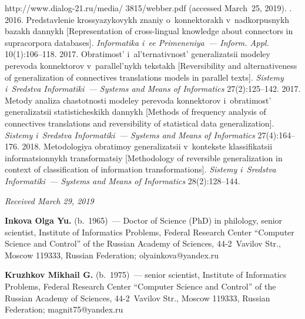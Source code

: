 \begin{multicols}{2}
{{\begin{thebibliography}{99}
{\sf http://www.dialog-21.ru/media/ 3815/webber.pdf} (accessed 
March~25, 2019).
. 2016. 
Predstavlenie krossyazykovykh znaniy o~konnektorakh v~nadkorpusnykh bazakh dannykh 
[Representation of cross-lingual knowledge about connectors in supracorpora databases]. 
\textit{Informatika i~ee Primeneniya~--- Inform. Appl.} 10(1):106--118.
 2017. Obratimost' 
i~al'ternativnost' generalizatsii modeley perevoda konnektorov v~parallel'nykh tekstakh 
[Reversibility and alternativeness of generalization of connectives translations models in 
parallel texts]. \textit{Sistemy i~Sredstva Informatiki~--- Systems and Means of Informatics} 
27(2):125--142.
 2017. Metody analiza 
chastotnosti modeley perevoda konnektorov i~obratimost' generalizatsii statisticheskikh 
dannykh [Methods of frequency analysis of connectives translations and reversibility of 
statistical data generalization]. \textit{Sistemy i~Sredstva Informatiki~--- Systems and Means of 
Informatics} 27(4):164--176.
 2018. Metodologiya obratimoy ge\-ne\-ra\-li\-za\-tsii v~kontekste klassifikatsii 
informatsionnykh transformatsiy [Methodology of reversible generalization in context of 
classification of information transformations]. \textit{Sistemy i~Sredstva Informatiki~--- 
Systems and Means of Informatics} 28(2):128--144.
\end{thebibliography}

 }
 }

\end{multicols}

\vspace*{-6pt}

\hfill{\small\textit{Received March 29, 2019}}



  \Contr
  
  \noindent
  \textbf{Inkova Olga Yu.} (b.\ 1965)~--- Doctor of Science (PhD) in philology, 
senior scientist, Institute of Informatics Problems, Federal Research Center 
``Computer Science and Control'' of the Russian Academy of Sciences, 44-2~Vavilov 
Str., Moscow 119333, Russian Federation; \mbox{olyainkova@yandex.ru}
  
  \vspace*{3pt}
  
  \noindent
  \textbf{Kruzhkov Mikhail G.} (b.\ 1975)~--- senior scientist, Institute of 
Informatics Problems, Federal Research Center ``Computer Science and Control'' of 
the Russian Academy of Sciences, 44-2~Vavilov Str., Moscow 119333, Russian 
Federation; \mbox{magnit75@yandex.ru}



\label{end\stat}

\renewcommand{\bibname}{\protect\rm Литература}